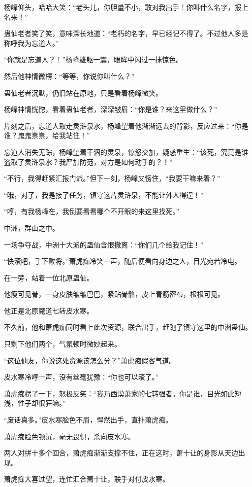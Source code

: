 \begin{this_body}
杨峰仰头，哈哈大笑：“老头儿，你胆量不小，敢对我出手！你叫什么名字，报上名来！”

蛊仙老者笑了笑，意味深长地道：“老朽的名字，早已经记不得了。不过他人多是称呼我为忘道人。”

“你就是忘道人？！”杨峰雄躯一震，眼眸中闪过一抹惊色。

然后他神情微楞：“等等，你说你叫什么？”

蛊仙老者沉默，仍旧站在原地，只是看着杨峰微笑。

杨峰神情恍惚，看着蛊仙老者，深深皱眉：“你是谁？来这里做什么？”

片刻之后，忘道人取走灵浒泉水，杨峰望着他渐渐远去的背影，反应过来：“你是谁？鬼鬼祟祟，给我站住！”

忘道人消失无踪，杨峰望着干涸的灵泉，惊怒交加，疑惑重生：“该死，究竟是谁盗取了灵浒泉水？我严加防范，对方是如何动手的？！”

“不行，我得赶紧汇报门派。”但下一刻，杨峰又愣住，“我要干嘛来着？”

“哦，对了，我是接了任务，镇守这片灵浒泉，不能让外人得逞！”

“哼，有我杨峰在，我倒要看看哪个不开眼的来这里找死。”

中洲，群山之中。

一场争夺战，中洲十大派的蛊仙含恨撤离：“你们几个给我记住！”

“快滚吧，手下败将。”萧虎痴冷笑一声，随后便看向身边之人，目光宛若冷电。

在一旁，站着一位北原蛊仙。

他瘦可见骨，一身皮肤皱皱巴巴，紧贴骨骼，皮上青筋密布，根根可见。

他正是北原魔道七转皮水寒。

不久前，他和萧虎痴同时看上此次资源，联合出手，赶跑了镇守这里的中洲蛊仙。

只剩下他们两个，气氛顿时微妙起来。

“这位仙友，你说这处资源该怎么分？”萧虎痴假客气道。

皮水寒冷哼一声，没有丝毫犹豫：“你也可以滚了。”

萧虎痴楞了一下，怒极反笑：“我乃西漠萧家的七转强者，你是谁，目光如此短浅，性子却很狂嘛。”

“废话真多。”皮水寒脸色不屑，悍然出手，直扑萧虎痴。

萧虎痴脸色顿沉，毫无畏惧，杀向皮水寒。

两人对拼十多个回合，萧虎痴渐渐支撑不住，正在这时，萧十让的身影从天边出现。

萧虎痴大喜过望，连忙汇合萧十让，联手对付皮水寒。


\end{this_body}
